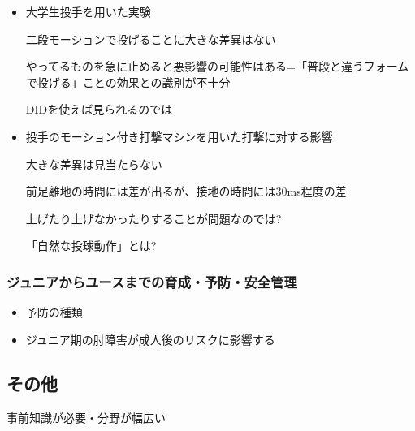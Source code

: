 \documentclass[dvipdfmx, 10.5pt]{jsarticle}
\begin{document}
\begin{itemize}
  \item 大学生投手を用いた実験

  二段モーションで投げることに大きな差異はない

  やってるものを急に止めると悪影響の可能性はある=「普段と違うフォームで投げる」ことの効果との識別が不十分

  DIDを使えば見られるのでは

  \item 投手のモーション付き打撃マシンを用いた打撃に対する影響

  大きな差異は見当たらない

  前足離地の時間には差が出るが、接地の時間には30ms程度の差

  上げたり上げなかったりすることが問題なのでは?

  「自然な投球動作」とは?
\end{itemize}

\subsubsection{ジュニアからユースまでの育成・予防・安全管理}

\begin{itemize}
  \item 予防の種類

  \item ジュニア期の肘障害が成人後のリスクに影響する
\end{itemize}

\subsection{その他}

事前知識が必要・分野が幅広い
\end{document}
